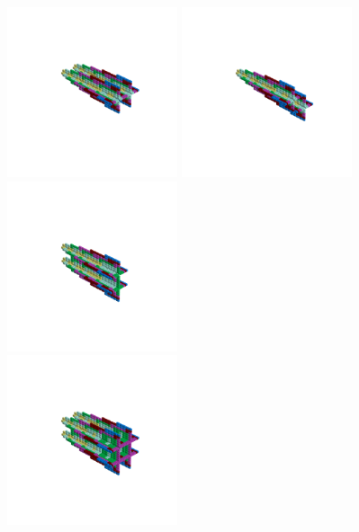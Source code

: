 \begin{minipage}[b]{0.48\linewidth}                                       
  \begin{figure}[H]
      \centering
        \vspace*{-1cm}
        \hspace*{-2cm}
        \includegraphics[width=5cm]{src/symmetries/pattern7_1-45.png}%
        \hspace*{-3cm}
        \includegraphics[width=5cm]{src/symmetries/pattern7_2-45.png}\\
        \vspace*{-3cm}
        \hspace*{-4cm}
        \includegraphics[width=5cm]{src/symmetries/pattern7_3-45.png} \\
        \vspace*{-5cm}
        \includegraphics[width=5cm]{src/symmetries/pattern7_4-45.png}
        \vspace*{-1cm}
  \caption*{}
  \end{figure}
\end{minipage}
